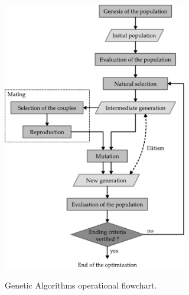 \documentclass{ametsoc}
\begin{document}
%




%


\begin{figure}[t]
	\begin{center}
		\noindent\includegraphics[width=19pc,angle=0]{fig01.pdf}\\
	\end{center}
	\caption{Genetic Algorithms operational flowchart.}
	\label{fig:structure_gas}
\end{figure}
\end{document}

